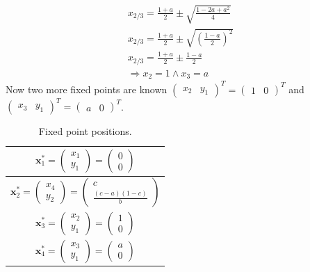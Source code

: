 \begin{align}
x_{2/3} = \frac{1+a}{2} \pm \sqrt{\frac{1 - 2a + a^2}{4} } \\
x_{2/3} = \frac{1+a}{2} \pm \sqrt{(\frac{1 - a}{2})^2 } \\
x_{2/3} = \frac{1+a}{2} \pm \frac{1 - a}{2} \\
\Rightarrow x_2 = 1 \wedge x_3 = a
\end{align}
Now two more fixed points are known $\begin{pmatrix} x_2 & y_1 \end{pmatrix}^T = \begin{pmatrix} 1 & 0 \end{pmatrix}^T$ and 
$\begin{pmatrix} x_3 & y_1 \end{pmatrix}^T = \begin{pmatrix} a & 0 \end{pmatrix}^T$. 

\begin{table}
\centering
\begin{tabular}{|c|}
\hline
$\mathbf{x}_1^* = \begin{pmatrix} x_1 \\ y_1 \end{pmatrix} = \begin{pmatrix} 0 \\ 0 \end{pmatrix}$ \\
\hline
$\mathbf{x}_2^* =\begin{pmatrix} x_4 \\ y_2 \end{pmatrix} = \begin{pmatrix} c \\ \frac{(c -a )(1-c)}{b} \end{pmatrix}$\\
\hline
$\mathbf{x}_3^* =\begin{pmatrix} x_2 \\ y_1 \end{pmatrix} = \begin{pmatrix} 1 \\ 0 \end{pmatrix}$\\
\hline
$\mathbf{x}_4^* =\begin{pmatrix} x_3 \\ y_1 \end{pmatrix} = \begin{pmatrix} a \\ 0 \end{pmatrix}$\\
\hline
\end{tabular}
\caption{Fixed point positions.}
\end{table}

